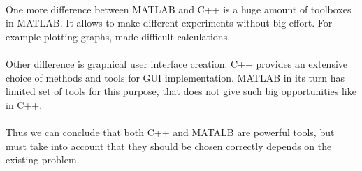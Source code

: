 \paragraph{}
	One more difference between MATLAB and C++ is a huge amount of toolboxes in MATLAB. It allows to make different experiments without big effort. For example plotting graphs, made difficult calculations.

\paragraph{}
	Other difference is graphical user interface creation. C++ provides an extensive choice of methods and tools for GUI implementation. MATLAB in its turn has limited set of tools for this purpose, that does not give such big opportunities like in C++.

\paragraph{}
	Thus we can conclude that both C++ and MATALB are powerful tools, but must take into account that they should be chosen correctly depends on the existing problem.

